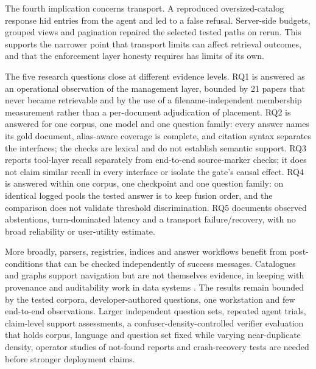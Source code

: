 The fourth implication concerns transport. A reproduced oversized-catalog
response hid entries from the agent and led to a false refusal. Server-side
budgets, grouped views and pagination repaired the selected tested paths on
rerun. This supports the narrower point that transport limits can affect
retrieval outcomes, and that the enforcement layer honesty requires has
limits of its own.

The five research questions close at different evidence levels. RQ1 is
answered as an operational observation of the management layer, bounded by 21
papers that never became retrievable and by the use of a filename-independent
membership measurement rather than a per-document adjudication of placement.
RQ2 is answered for one corpus, one model and one question family: every
answer names its gold document, alias-aware coverage is complete, and citation
syntax separates the interfaces; the checks are lexical and do not establish
semantic support. RQ3 reports tool-layer recall separately from end-to-end
source-marker checks; it does not claim similar recall in every interface or
isolate the gate's causal effect. RQ4 is answered within one corpus, one
checkpoint and one question family: on identical logged pools the tested
answer is to keep fusion order, and the comparison does not validate threshold
discrimination. RQ5 documents observed abstentions, turn-dominated latency and
a transport failure/recovery, with no broad reliability or user-utility
estimate.

More broadly, parsers, registries, indices and answer workflows benefit from
post-conditions that can be checked independently of success messages.
Catalogues and graphs support navigation but are not themselves evidence, in
keeping with provenance and auditability work in data systems
\cite{missier-prov-2013,cheney-provenance-2009}. The results remain bounded by
the tested corpora, developer-authored questions, one workstation and few
end-to-end observations. Larger independent question sets, repeated agent
trials, claim-level support assessments, a confuser-density-controlled
verifier evaluation that holds corpus, language and question set fixed while
varying near-duplicate density, operator studies of not-found reports and
crash-recovery tests are needed before stronger deployment claims.
